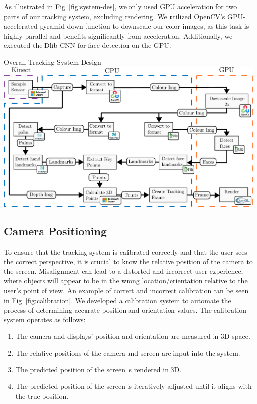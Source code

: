 As illustrated in Fig~\ref{fig:system-des}, we only used GPU acceleration for two parts of our tracking system, excluding rendering. We utilized OpenCV's GPU-accelerated pyramid down function to downscale our color images, as this task is highly parallel and benefits significantly from acceleration. Additionally, we executed the Dlib CNN for face detection on the GPU.

\begin{figureBox}[label={fig:system-des}, width=0.95\linewidth]{Overall Tracking System Design}
    \includegraphics[width=1.0\linewidth]{./implementation/figures/tracking-system.pdf}
\end{figureBox}


\subsection{Camera Positioning}

To ensure that the tracking system is calibrated correctly and that the user sees the correct perspective, it is crucial to know the relative position of the camera to the screen. Misalignment can lead to a distorted and incorrect user experience, where objects will appear to be in the wrong location/orientation relative to the user's point of view. An example of correct and incorrect calibration can be seen in Fig~\ref{fig:calibration}. We developed a calibration system to automate the process of determining accurate position and orientation values. The calibration system operates as follows:
\begin{enumerate}[itemsep=-0.3em]
    \item The camera and displays' position and orientation are measured in 3D space.
    \item The relative positions of the camera and screen are input into the system.
    \item The predicted position of the screen is rendered in 3D.
    \item The predicted position of the screen is iteratively adjusted until it aligns with the true position.
\end{enumerate}

